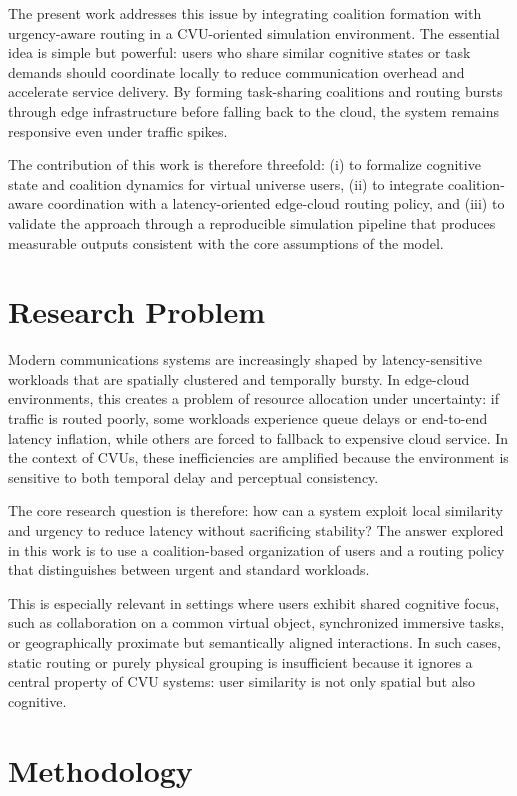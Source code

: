 \documentclass[11pt]{article}
\begin{document}
The present work addresses this issue by integrating coalition formation with urgency-aware routing in a CVU-oriented simulation environment. The essential idea is simple but powerful: users who share similar cognitive states or task demands should coordinate locally to reduce communication overhead and accelerate service delivery. By forming task-sharing coalitions and routing bursts through edge infrastructure before falling back to the cloud, the system remains responsive even under traffic spikes.

The contribution of this work is therefore threefold: (i) to formalize cognitive state and coalition dynamics for virtual universe users, (ii) to integrate coalition-aware coordination with a latency-oriented edge-cloud routing policy, and (iii) to validate the approach through a reproducible simulation pipeline that produces measurable outputs consistent with the core assumptions of the model.

\section{Research Problem}
Modern communications systems are increasingly shaped by latency-sensitive workloads that are spatially clustered and temporally bursty. In edge-cloud environments, this creates a problem of resource allocation under uncertainty: if traffic is routed poorly, some workloads experience queue delays or end-to-end latency inflation, while others are forced to fallback to expensive cloud service. In the context of CVUs, these inefficiencies are amplified because the environment is sensitive to both temporal delay and perceptual consistency.

The core research question is therefore: how can a system exploit local similarity and urgency to reduce latency without sacrificing stability? The answer explored in this work is to use a coalition-based organization of users and a routing policy that distinguishes between urgent and standard workloads.

This is especially relevant in settings where users exhibit shared cognitive focus, such as collaboration on a common virtual object, synchronized immersive tasks, or geographically proximate but semantically aligned interactions. In such cases, static routing or purely physical grouping is insufficient because it ignores a central property of CVU systems: user similarity is not only spatial but also cognitive.

\section{Methodology}
\end{document}
